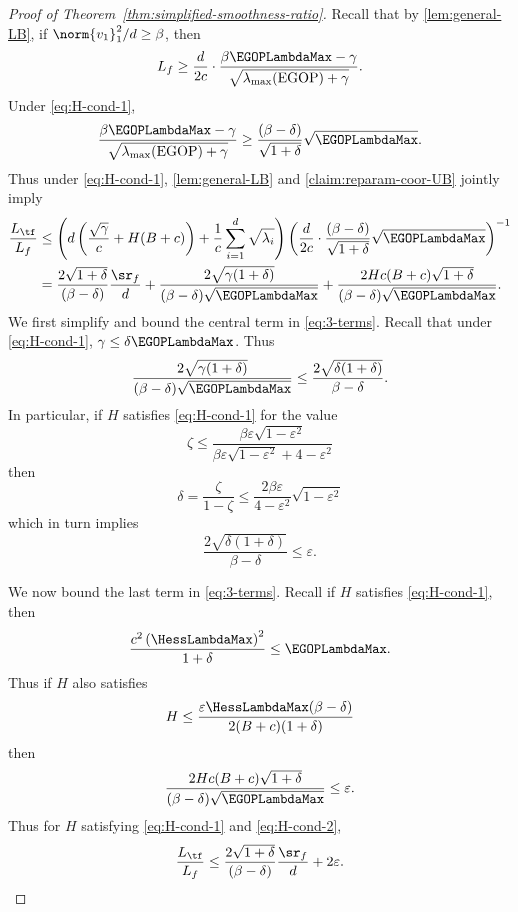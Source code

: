 \begin{proof}[Proof of Theorem~\ref{thm:simplified-smoothness-ratio}]
    Recall that by \cref{lem:general-LB}, if $\norm{v_1}^2_1/d\geq \beta$, then 
    \[
        L_f \geq \frac{d}{2c}\cdot \frac{\beta \EGOPLambdaMax - \gamma}{\sqrt{\lambda_{\max}(\operatorname{EGOP}) + \gamma}}.
    \]
    Under \cref{eq:H-cond-1},
    \[
        \frac{\beta \EGOPLambdaMax - \gamma}{\sqrt{\lambda_{\max}(\operatorname{EGOP}) + \gamma}} \geq \frac{(\beta-\delta)}{\sqrt{1+\delta}}\sqrt{\EGOPLambdaMax}.
    \]
    Thus under \cref{eq:H-cond-1}, \cref{lem:general-LB} and \cref{claim:reparam-coor-UB} jointly imply
    \begin{align}
        \frac{L_{\tf}}{L_f} &\leq \left(d\left(\frac{\sqrt{\gamma}}{c} + H(B+c)\right)+ \frac{1}{c}\sum_{i=1}^d \sqrt{\lambda_i}\right)\left(\frac{d}{2c}\cdot\frac{(\beta-\delta)}{\sqrt{1+\delta}}\sqrt{\EGOPLambdaMax}\right)^{-1}\\
        &\label{eq:3-terms}=\frac{2\sqrt{1+\delta}}{(\beta-\delta)}\frac{\sr_f}{d} + \frac{2\sqrt{\gamma(1+\delta)}}{(\beta-\delta)\sqrt{\EGOPLambdaMax}} + \frac{2Hc(B+c)\sqrt{1+\delta}}{(\beta-\delta)\sqrt{\EGOPLambdaMax}}.
    \end{align}
    We first simplify and bound the central term in \cref{eq:3-terms}. Recall that under \cref{eq:H-cond-1}, $\gamma \leq \delta \EGOPLambdaMax$. Thus
    \[
        \frac{2\sqrt{\gamma(1+\delta)}}{(\beta-\delta)\sqrt{\EGOPLambdaMax}} \leq \frac{2\sqrt{\delta(1+\delta)}}{\beta-\delta}.
    \]
    In particular, if $H$ satisfies \cref{eq:H-cond-1} for the value
    \[
        \zeta \leq \frac{\beta \varepsilon\sqrt{1-\varepsilon^2}}{\beta \varepsilon\sqrt{1-\varepsilon^2} + 4-\varepsilon^2}
    \]
    then
    \[
        \delta  = \frac{\zeta}{1-\zeta}\leq \frac{2\beta \varepsilon}{4-\varepsilon^2}\sqrt{1-\varepsilon^2}
    \]
    which in turn implies
    \[
        \frac{2\sqrt{\delta(1+\delta)}}{\beta-\delta} \leq \varepsilon.
    \]

    We now bound the last term in \cref{eq:3-terms}. Recall if $H$ satisfies \cref{eq:H-cond-1}, then
    \[
        \frac{c^2\left(\HessLambdaMax\right)^2}{1+\delta} \leq \EGOPLambdaMax.
    \]
    Thus if $H$ also satisfies
    \begin{equation}\label{eq:H-cond-2}
        H \leq \frac{\varepsilon\HessLambdaMax (\beta-\delta)}{2(B+c)(1+\delta)}
    \end{equation}
    then
    \[
        \frac{2Hc(B+c)\sqrt{1+\delta}}{(\beta-\delta)\sqrt{\EGOPLambdaMax}} \leq \varepsilon.
    \]
    Thus for $H$ satisfying \cref{eq:H-cond-1} and \cref{eq:H-cond-2},
    \[
        \frac{L_{\tf}}{L_f}\leq \frac{2\sqrt{1+\delta}}{(\beta-\delta)}\frac{\sr_f}{d} +2\varepsilon.
    \]
\end{proof}

